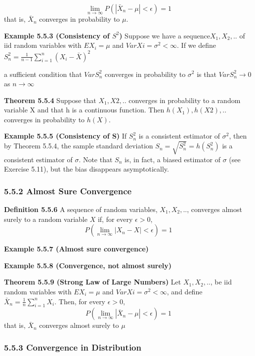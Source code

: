 \documentclass[6pt,Portrait]{article}
\begin{document}
\[\lim_{n\to\infty}P(|\bar X_n-\mu|<\epsilon)=1\] that is, \(\bar X_n\)
converges in probability to \(\mu\).

\textbf{Example 5.5.3 (Consistency of \(S^2\))} Suppose we have a
sequence\(X_1,X_2,..\) of iid random variables with \(EX_i=\mu\) and
\(Var Xi =\sigma^2<\infty\). If we define
\(S_n^2=\frac1{n-1}\sum_{i=1}^n(X_i-\bar X)^2\)

a sufficient condition that \(VarS^2_n\) converges in probability to
\(\sigma^2\) is that \(VarS^2_n\to0\) as \(n\to\infty\)

\textbf{Theorem 5.5.4} Suppose that \(X_1, X2,..\) converges in
probability to a random variable X and that h is a continuous function.
Then \(h(X_1),h(X2),..\) converges in probability to \(h(X)\).

\textbf{Example 5.5.5 (Consistency of S)} If \(S^2_n\) is a consistent
estimator of \(\sigma^2\), then by Theorem 5.5.4, the sample standard
deviation \(S_n=\sqrt{S^2_n}=h(S^2_n)\) is a consistent estimator of
\(\sigma\). Note that \(S_n\) is, in fact, a biased estimator of
\(\sigma\) (see Exercise 5.11), but the bias disappears asymptotically.

\hypertarget{almost-sure-convergence}{%
\subsubsection{5.5.2 Almost Sure
Convergence}\label{almost-sure-convergence}}

\textbf{Definition 5.5.6} A sequence of random variables,
\(X_1,X_2,..\), converges almost surely to a random variable \(X\) if,
for every \(\epsilon>0\), \[P(\lim_{n\to\infty}|X_n-X|<\epsilon)=1\]

\textbf{Example 5.5.7 (Almost sure convergence)}

\textbf{Example 5.5.8 (Convergence, not almost surely)}

\textbf{Theorem 5.5.9 (Strong Law of Large Numbers)} Let \(X_1,X_2,..\),
be iid random variables with \(EX_i=\mu\) and
\(Var Xi =\sigma^2<\infty\), and define
\(\bar X_n=\frac1n\sum_{i=1}^nX_i\). Then, for every \(\epsilon>0\),
\[P(\lim_{n\to\infty}|\bar X_n-\mu|<\epsilon)=1\] that is, \(\bar X_n\)
converges almost surely to \(\mu\)

\hypertarget{convergence-in-distribution}{%
\subsubsection{5.5.3 Convergence in
Distribution}\label{convergence-in-distribution}}
\end{document}
